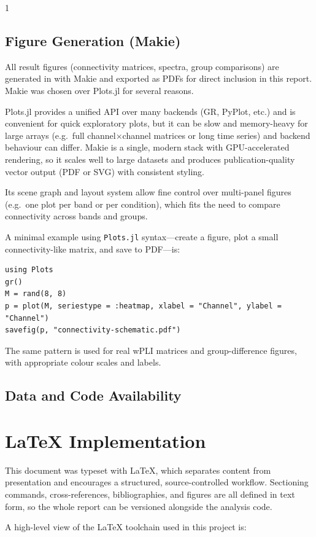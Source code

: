 \begin{multicols}{1}

\subsection{Figure Generation (Makie)}

All result figures (connectivity matrices, spectra, group comparisons) are generated in \Julia{} with Makie and exported as PDFs for direct inclusion in this report. Makie was chosen over Plots.jl for several reasons. 

Plots.jl provides a unified API over many backends (GR, PyPlot, etc.) and is convenient for quick exploratory plots, but it can be slow and memory-heavy for large arrays (e.g.\ full channel$\times$channel matrices or long time series) and backend behaviour can differ. Makie is a single, modern stack with GPU-accelerated rendering, so it scales well to large datasets and produces publication-quality vector output (PDF or SVG) with consistent styling. 

Its scene graph and layout system allow fine control over multi-panel figures (e.g.\ one plot per band or per condition), which fits the need to compare connectivity across bands and groups.

A minimal example using \texttt{Plots.jl} syntax—create a figure, plot a small connectivity-like matrix, and save to PDF—is:

\begin{lstlisting}[caption={Minimal Plots.jl workflow for exporting a connectivity-style figure to PDF.}]
using Plots
gr()
M = rand(8, 8)
p = plot(M, seriestype = :heatmap, xlabel = "Channel", ylabel = "Channel")
savefig(p, "connectivity-schematic.pdf")
\end{lstlisting}

The same pattern is used for real wPLI matrices and group-difference figures, with appropriate colour scales and labels.

\subsection{Data and Code Availability}

\section{\LaTeX{} Implementation}

This document was typeset with \LaTeX, which separates content from presentation and encourages a structured, source-controlled workflow. Sectioning commands, cross-references, bibliographies, and figures are all defined in text form, so the whole report can be versioned alongside the analysis code.

A high-level view of the \LaTeX{} toolchain used in this project is:

\end{multicols}

